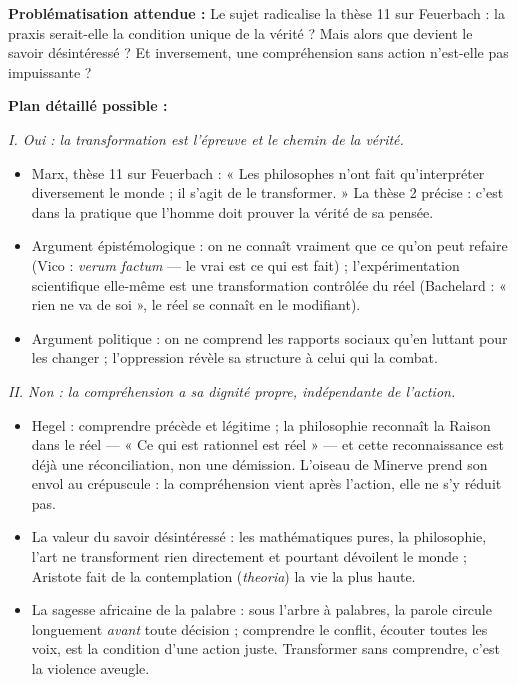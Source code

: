 \documentclass[11pt]{article}
\begin{document}
\begin{corrige}
\textbf{Problématisation attendue :} Le sujet radicalise la thèse 11 sur Feuerbach : la praxis serait-elle la condition unique de la vérité ? Mais alors que devient le savoir désintéressé ? Et inversement, une compréhension sans action n'est-elle pas impuissante ?

\textbf{Plan détaillé possible :}

\emph{I. Oui : la transformation est l'épreuve et le chemin de la vérité.}
\begin{itemize}
\item Marx, thèse 11 sur Feuerbach : « Les philosophes n'ont fait qu'interpréter diversement le monde ; il s'agit de le transformer. » La thèse 2 précise : c'est dans la pratique que l'homme doit prouver la vérité de sa pensée.
\item Argument épistémologique : on ne connaît vraiment que ce qu'on peut refaire (Vico : \emph{verum factum} — le vrai est ce qui est fait) ; l'expérimentation scientifique elle-même est une transformation contrôlée du réel (Bachelard : « rien ne va de soi », le réel se connaît en le modifiant).
\item Argument politique : on ne comprend les rapports sociaux qu'en luttant pour les changer ; l'oppression révèle sa structure à celui qui la combat.
\end{itemize}

\emph{II. Non : la compréhension a sa dignité propre, indépendante de l'action.}
\begin{itemize}
\item Hegel : comprendre précède et légitime ; la philosophie reconnaît la Raison dans le réel — « Ce qui est rationnel est réel » — et cette reconnaissance est déjà une réconciliation, non une démission. L'oiseau de Minerve prend son envol au crépuscule : la compréhension vient après l'action, elle ne s'y réduit pas.
\item La valeur du savoir désintéressé : les mathématiques pures, la philosophie, l'art ne transforment rien directement et pourtant dévoilent le monde ; Aristote fait de la contemplation (\emph{theoria}) la vie la plus haute.
\item La sagesse africaine de la palabre : sous l'arbre à palabres, la parole circule longuement \emph{avant} toute décision ; comprendre le conflit, écouter toutes les voix, est la condition d'une action juste. Transformer sans comprendre, c'est la violence aveugle.
\end{itemize}


\end{corrige}
\end{document}
